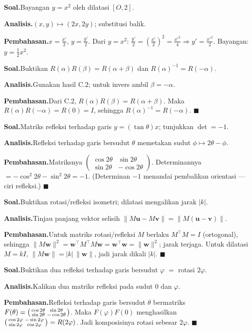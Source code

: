 \documentclass[11pt,a4paper]{report}
\theoremstyle{gaya}
\newcommand{\knomor}[1]{\par\medskip\noindent{\bfseries\color{ungu}#1}\par\nopagebreak}
\newcommand{\ksoal}{\noindent\textbf{\color{biru}Soal.}\space}
\newcommand{\kanalisis}{\par\noindent\textbf{\color{oranye}Analisis.}\space}
\newcommand{\kbahas}{\par\noindent\textbf{\color{hijau}Pembahasan.}\space}
\newcommand{\kbagian}[1]{\par\medskip\noindent{\large\bfseries\color{biru}#1}\par\smallskip}
\begin{document}
\knomor{C.6}
\ksoal Bayangan $y=x^2$ oleh dilatasi $[O,2]$.
\kanalisis $(x,y)\mapsto(2x,2y)$; substitusi balik.
\kbahas $x=\tfrac{x'}2$, $y=\tfrac{y'}2$. Dari $y=x^2$: $\tfrac{y'}2=\left(\tfrac{x'}2\right)^2=\tfrac{x'^2}4\Rightarrow y'=\tfrac{x'^2}2$. Bayangan: $y=\tfrac12x^2.$

\kbagian{Bagian D}

\knomor{D.1}
\ksoal Buktikan $R(\alpha)R(\beta)=R(\alpha+\beta)$ dan $R(\alpha)^{-1}=R(-\alpha)$.
\kanalisis Gunakan hasil C.2; untuk invers ambil $\beta=-\alpha$.
\kbahas Dari C.2, $R(\alpha)R(\beta)=R(\alpha+\beta)$. Maka $R(\alpha)R(-\alpha)=R(0)=I$, sehingga $R(\alpha)^{-1}=R(-\alpha)$. $\blacksquare$

\knomor{D.2}
\ksoal Matriks refleksi terhadap garis $y=(\tan\theta)x$; tunjukkan $\det=-1$.
\kanalisis Refleksi terhadap garis bersudut $\theta$ memetakan sudut $\phi\mapsto2\theta-\phi$.
\kbahas Matriksnya $\begin{pmatrix}\cos2\theta&\sin2\theta\\ \sin2\theta&-\cos2\theta\end{pmatrix}$. Determinannya $=-\cos^2 2\theta-\sin^2 2\theta=-1$. (Determinan $-1$ menandai pembalikan orientasi --- ciri refleksi.) $\blacksquare$

\knomor{D.3}
\ksoal Buktikan rotasi/refleksi isometri; dilatasi mengalikan jarak $|k|$.
\kanalisis Tinjau panjang vektor selisih $\|M\mathbf u-M\mathbf v\|=\|M(\mathbf u-\mathbf v)\|$.
\kbahas Untuk matriks rotasi/refleksi $M$ berlaku $M^\top M=I$ (ortogonal), sehingga $\|M\mathbf w\|^2=\mathbf w^\top M^\top M\mathbf w=\mathbf w^\top\mathbf w=\|\mathbf w\|^2$; jarak terjaga. Untuk dilatasi $M=kI$, $\|M\mathbf w\|=|k|\,\|\mathbf w\|$, jadi jarak dikali $|k|$. $\blacksquare$

\knomor{D.4}
\ksoal Buktikan dua refleksi terhadap garis bersudut $\varphi$ $=$ rotasi $2\varphi$.
\kanalisis Kalikan dua matriks refleksi pada sudut $0$ dan $\varphi$.
\kbahas Refleksi terhadap garis bersudut $\theta$ bermatriks $F(\theta)=\begin{psmallmatrix}\cos2\theta&\sin2\theta\\ \sin2\theta&-\cos2\theta\end{psmallmatrix}$. Maka $F(\varphi)F(0)$ menghasilkan $\begin{psmallmatrix}\cos2\varphi&-\sin2\varphi\\ \sin2\varphi&\cos2\varphi\end{psmallmatrix}=R(2\varphi)$. Jadi komposisinya rotasi sebesar $2\varphi$. $\blacksquare$
\end{document}
